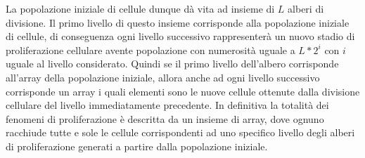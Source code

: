 La popolazione iniziale di cellule dunque dà vita ad insieme di $L$ alberi di
divisione. Il primo livello di questo insieme corrisponde alla popolazione
iniziale di cellule, di conseguenza ogni livello successivo rappresenterà
un nuovo stadio di proliferazione cellulare avente popolazione con numerosità
uguale a $L * 2^{i}$ con $i$ uguale al livello considerato.
Quindi se il primo livello dell'albero corrisponde all'array della popolazione
iniziale, allora anche ad ogni livello successivo corrisponde un array i quali
elementi sono le nuove cellule ottenute dalla divisione cellulare del livello
immediatamente precedente.
In definitiva la totalità dei fenomeni di proliferazione è descritta da un
insieme di array, dove ognuno racchiude tutte e sole le cellule
corrispondenti ad uno specifico livello degli alberi di proliferazione generati
a partire dalla popolazione iniziale.
